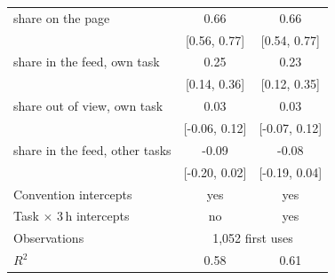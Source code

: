 \begin{tabular}{lcc}
share on the page & 0.66 & 0.66 \\
 & [0.56, 0.77] & [0.54, 0.77] \\
share in the feed, own task & 0.25 & 0.23 \\
 & [0.14, 0.36] & [0.12, 0.35] \\
share out of view, own task & 0.03 & 0.03 \\
 & [-0.06, 0.12] & [-0.07, 0.12] \\
share in the feed, other tasks & -0.09 & -0.08 \\
 & [-0.20, 0.02] & [-0.19, 0.04] \\
Convention intercepts & yes & yes \\
Task $\times$ 3\,h intercepts & no & yes \\
Observations & \multicolumn{2}{c}{1,052 first uses} \\
$R^2$ & 0.58 & 0.61 \\
\bottomrule
\end{tabular}
